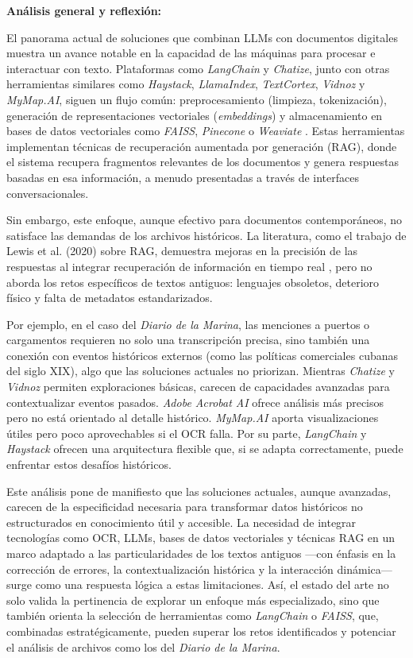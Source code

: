 \textbf{Análisis general y reflexión:}

El panorama actual de soluciones que combinan LLMs con documentos digitales muestra un avance notable en la capacidad de las máquinas para procesar e interactuar con texto. Plataformas como \textit{LangChain} y \textit{Chatize}, junto con otras herramientas similares como \textit{Haystack}, \textit{LlamaIndex}, \textit{TextCortex}, \textit{Vidnoz} y \textit{MyMap.AI}, siguen un flujo común: preprocesamiento (limpieza, tokenización), generación de representaciones vectoriales (\textit{embeddings}) y almacenamiento en bases de datos vectoriales como \textit{FAISS}, \textit{Pinecone} o \textit{Weaviate} \cite{lewis2020retrieval, mikolov2013efficient, chatize2023web, haystack2023docs, llamaindex2023web}. Estas herramientas implementan técnicas de recuperación aumentada por generación (RAG), donde el sistema recupera fragmentos relevantes de los documentos y genera respuestas basadas en esa información, a menudo presentadas a través de interfaces conversacionales.

Sin embargo, este enfoque, aunque efectivo para documentos contemporáneos, no satisface las demandas de los archivos históricos. La literatura, como el trabajo de Lewis et al. (2020) sobre RAG, demuestra mejoras en la precisión de las respuestas al integrar recuperación de información en tiempo real \cite{lewis2020retrieval}, pero no aborda los retos específicos de textos antiguos: lenguajes obsoletos, deterioro físico y falta de metadatos estandarizados.

Por ejemplo, en el caso del \textit{Diario de la Marina}, las menciones a puertos o cargamentos requieren no solo una transcripción precisa, sino también una conexión con eventos históricos externos (como las políticas comerciales cubanas del siglo XIX), algo que las soluciones actuales no priorizan. Mientras \textit{Chatize} y \textit{Vidnoz} permiten exploraciones básicas, carecen de capacidades avanzadas para contextualizar eventos pasados. \textit{Adobe Acrobat AI} ofrece análisis más precisos pero no está orientado al detalle histórico. \textit{MyMap.AI} aporta visualizaciones útiles pero poco aprovechables si el OCR falla. Por su parte, \textit{LangChain} y \textit{Haystack} ofrecen una arquitectura flexible que, si se adapta correctamente, puede enfrentar estos desafíos históricos.

Este análisis pone de manifiesto que las soluciones actuales, aunque avanzadas, carecen de la especificidad necesaria para transformar datos históricos no estructurados en conocimiento útil y accesible. La necesidad de integrar tecnologías como OCR, LLMs, bases de datos vectoriales y técnicas RAG en un marco adaptado a las particularidades de los textos antiguos —con énfasis en la corrección de errores, la contextualización histórica y la interacción dinámica— surge como una respuesta lógica a estas limitaciones. Así, el estado del arte no solo valida la pertinencia de explorar un enfoque más especializado, sino que también orienta la selección de herramientas como \textit{LangChain} o \textit{FAISS}, que, combinadas estratégicamente, pueden superar los retos identificados y potenciar el análisis de archivos como los del \textit{Diario de la Marina}.


